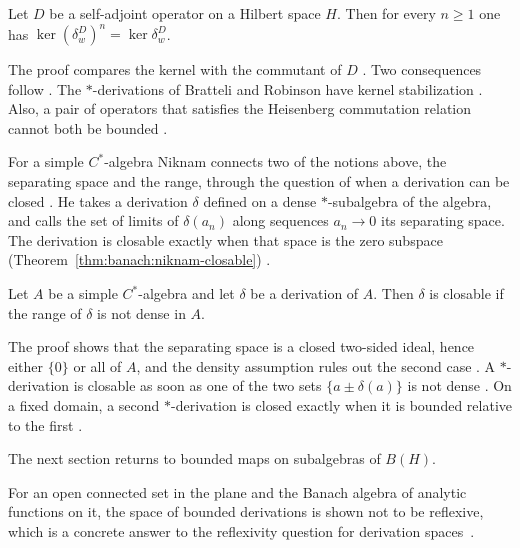 \begin{theorem}\label{thm:banach:kernel-stabilization}
Let $D$ be a self-adjoint operator on a Hilbert space $H$. Then for every
$n\geq 1$ one has $\ker(\delta_{w}^{D})^{n}=\ker\delta_{w}^{D}$.
\end{theorem}

The proof compares the kernel with the commutant of $D$
\cite[p.~7]{Ismert2018Kernel}. Two consequences follow
\cite[p.~7]{Ismert2018Kernel}. The $*$-derivations of Bratteli and Robinson
have kernel stabilization \cite[p.~8]{Ismert2018Kernel}. Also, a pair of
operators that satisfies the Heisenberg commutation relation cannot both be
bounded \cite[p.~8]{Ismert2018Kernel}.

For a simple $C^*$-algebra Niknam connects two of the notions above, the
separating space and the range, through the question of when a derivation can be closed
\cite[p.~181]{Niknam1983Closable}. He takes a derivation $\delta$ defined on a
dense $*$-subalgebra of the algebra, and calls the set of limits of
$\delta(a_n)$ along sequences $a_n\to0$ its separating space. The derivation
is closable exactly when that space is the zero subspace (Theorem~\ref{thm:banach:niknam-closable})
\cite[p.~181]{Niknam1983Closable}.\begin{theorem}\label{thm:banach:niknam-closable}
Let $A$ be a simple $C^*$-algebra and let $\delta$ be a derivation of $A$. Then
$\delta$ is closable if the range of $\delta$ is not dense in $A$.
\end{theorem}

The proof shows that the separating space is a closed two-sided ideal, hence
either $\{0\}$ or all of $A$, and the density assumption rules out the second
case \cite[p.~182]{Niknam1983Closable}. A $*$-derivation is closable as soon as
one of the two sets $\{a\pm\delta(a)\}$ is not dense
\cite[Corollary~2, p.~182]{Niknam1983Closable}. On a fixed domain, a second $*$-derivation is closed exactly when it is
bounded relative to the first \cite[Theorem~3, p.~182]{Niknam1983Closable}.

The next section returns to bounded
maps on subalgebras of $B(H)$. %

For an open connected set in the plane and the Banach algebra of analytic functions on it, the space of bounded derivations is shown not to be reflexive, which is a concrete answer to the reflexivity question for derivation spaces~\cite{WlNonReflexivityOfTheDerivationS2019}.

